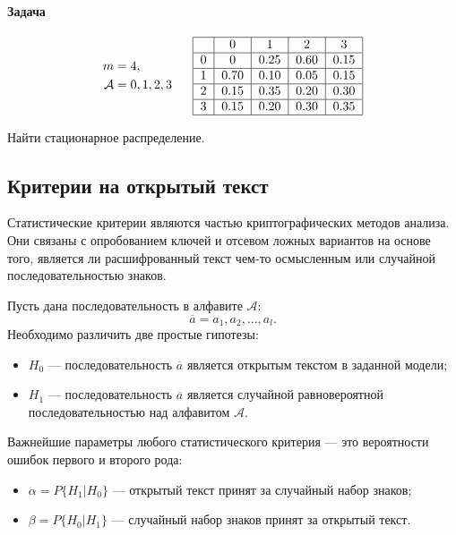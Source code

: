 \documentclass[a4paper,12pt]{article}
\begin{document}
\paragraph{Задача}
$$
\begin{aligned}
	m &= 4, \\
	\mathcal{A} &= {0,1,2,3} \\
\end{aligned} ~~~~~
\begin{tabular}{|c|c|c|c|c|}
	\hline
	~	&0	&1	& 2	& 3	\\
	\hline
	0	&0   &0.25&0.60&0.15\\
	\hline
	1	&0.70&0.10&0.05&0.15\\
	\hline
	2	&0.15&0.35&0.20&0.30\\
	\hline
	3	&0.15&0.20&0.30&0.35\\
	\hline
\end{tabular}$$

Найти стационарное распределение.

\subsection{Критерии на открытый текст}
Статистические критерии являются частью криптографических методов анализа. Они связаны с опробованием ключей и отсевом ложных вариантов на основе того, является ли расшифрованный текст чем-то осмысленным или случайной последовательностью знаков.

Пусть дана последовательность в алфавите $\mathcal{A}$:
$$
\overline{a} = a_1, a_2, ..., a_l.
$$
Необходимо различить две простые гипотезы:
\begin{itemize}
	\item $H_0$ --- последовательность $\overline{a}$ является открытым текстом в заданной модели;
	\item $H_1$ --- последовательность $\overline{a}$ является случайной равновероятной последовательностью над алфавитом $\mathcal{A}$.
\end{itemize}

Важнейшие параметры любого статистического критерия --- это вероятности ошибок первого и второго рода:
\begin{itemize}
	\item $\alpha = P\{H_1|H_0\}$ --- открытый текст принят за случайный набор знаков;
	\item $\beta = P\{H_0|H_1\}$ --- случайный набор знаков принят за открытый текст.
\end{itemize}
\end{document}
